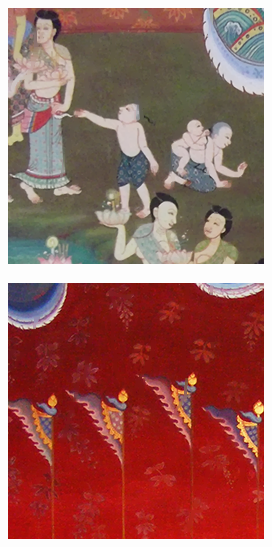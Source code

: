 \documentclass[hidelinks, a4paper,12pt]{article}
\numberwithin{equation}{section}							%
\numberwithin{equation}{section}
\begin{document}
{\begin{figure}[H]
\begin{subfigure}{0.4\linewidth}
		\end{subfigure}
		\begin{subfigure}{0.4\linewidth}
			\centering
			\includegraphics[width=0.8\linewidth]{images/result_ex4/splitbergman_case02.png}
		\end{subfigure}
		\begin{subfigure}{0.4\linewidth}
			\centering
			\includegraphics[width=0.8\linewidth]{images/result_ex4/splitbergman_case03.png}			
		\end{subfigure}
		\begin{subfigure}{0.4\linewidth}
			\centering

\end{subfigure}
\end{figure}}
\end{document}
